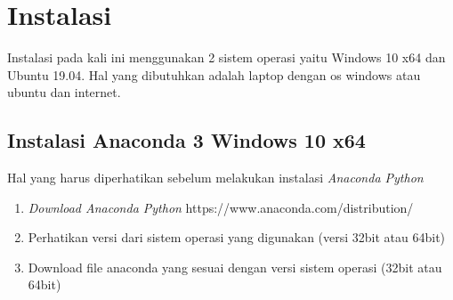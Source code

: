 \section{Instalasi}
Instalasi pada kali ini menggunakan 2 sistem operasi yaitu Windows 10 x64 dan Ubuntu 19.04. Hal yang dibutuhkan adalah laptop dengan os windows atau ubuntu dan internet.
\subsection{Instalasi Anaconda 3 Windows 10 x64}
Hal yang harus diperhatikan sebelum melakukan instalasi \textit{Anaconda Python}
\begin{enumerate}
 \item \textit{Download Anaconda Python} https://www.anaconda.com/distribution/
 \item Perhatikan versi dari sistem operasi yang digunakan (versi 32bit atau 64bit)
 \item Download file anaconda yang sesuai dengan versi sistem operasi (32bit atau 64bit)
\end{enumerate}

